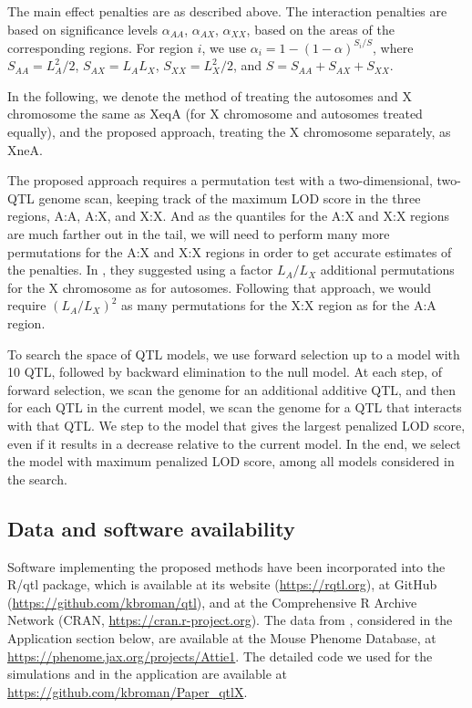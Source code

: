\documentclass[12pt,letterpaper]{article}
\begin{document}
The main effect penalties are as described above. The interaction
penalties are based on significance levels $\alpha_{AA}$,
$\alpha_{AX}$, $\alpha_{XX}$, based on the areas of the corresponding
regions. For region $i$, we use $\alpha_i = 1 - (1-\alpha)^{S_i/S}$,
where $S_{AA} = L_A^2/2$, $S_{AX} = L_AL_X$, $S_{XX} = L_X^2/2$, and
$S = S_{AA} + S_{AX} + S_{XX}$.

In the following, we denote the method of \citet{Manichaikul2009}
treating the autosomes and X chromosome the same as XeqA (for X
chromosome and autosomes treated equally), and the proposed approach,
treating the X chromosome separately, as XneA.

The proposed approach requires a permutation test with a
two-dimensional, two-QTL genome scan, keeping track of the maximum LOD
score in the three regions, A:A, A:X, and X:X. And as the quantiles
for the A:X and X:X regions are much farther out in the tail, we will
need to perform many more permutations for the A:X and X:X regions in
order to get accurate estimates of the penalties. In
\citet{Broman2006}, they suggested using a factor $L_A/L_X$ additional
permutations for the X chromosome as for autosomes. Following that
approach, we would require $(L_A/L_X)^2$ as many permutations for the
X:X region as for the A:A region.

To search the space of QTL models, we use forward selection up to a
model with 10 QTL, followed by backward elimination to
the null model. At each step, of forward selection, we scan the genome
for an additional additive QTL, and then for each QTL in the current
model, we scan the genome for a QTL that interacts with that QTL. We
step to the model that gives the largest penalized LOD score, even if
it results in a decrease relative to the current model. In the end, we
select the model with maximum penalized LOD score, among all models
considered in the search.

\subsection*{Data and software availability}

Software implementing the proposed methods have been incorporated into
the R/qtl package, which is available at its website
(\url{https://rqtl.org}), at GitHub
(\url{https://github.com/kbroman/qtl}), and at the Comprehensive R
Archive Network (CRAN, \url{https://cran.r-project.org}).
The data from \citet{Tian2016}, considered in the Application section
below, are available at
the Mouse Phenome Database, at
\url{https://phenome.jax.org/projects/Attie1}.
The detailed code we used for the simulations and in the application
are available at \url{https://github.com/kbroman/Paper_qtlX}.
\end{document}
